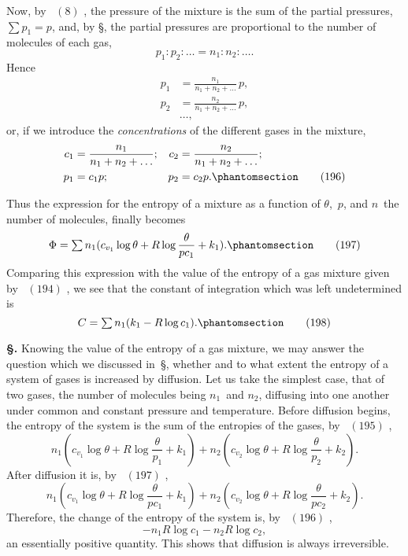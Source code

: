 \documentclass[12pt]{book}[2005/09/16]
\newcommand{\Typo}[2]{#2}
\newcommand{\Chg}[2]{#2}
\newcommand{\Add}[1]{\Chg{}{#1}}
\newcommand{\Erratum}[2]{#2}
\newcommand{\Section}[1]{
  \medskip\par\textbf{§\;#1}
  \label{section:#1}
}
\newcommand{\SecRef}[2][§\;]{\hyperref[section:#2.]{{\upshape #1#2}}}
\newcommand{\Tag}[1]{%
  \phantomsection\label{eqn:#1}\tag*{\ensuremath{#1}}%
}
\newcommand{\Eq}[1]{%
  \hyperref[eqn:#1]{\ensuremath{#1}}%
}
\newcommand{\PageSep}[1]{\ignorespaces}
\newcommand{\tsum}{\mathop{\textstyle\sum}\limits}
\begin{document}
Now, by~\Eq{(8)}, the pressure of the mixture is the sum of
the partial pressures, $\tsum p_{1} = p$, and, by \SecRef{40}, the partial
pressures are proportional to the number of molecules of
each gas,
\[
p_{1} : p_{2} : \dots = n_{1} : n_{2} : \dots\Add{.}
\]
Hence
\begin{align*}
p_{1} &= \frac{n_{1}}{n_{1} + n_{2} + \dots}\, p\Add{,} \\
p_{2} &= \frac{n_{2}}{n_{1} + n_{2} + \dots}\, p\Add{,} \\
& \dots\Add{,}
\end{align*}
or, if we introduce the \emph{concentrations} of the different gases
in the mixture,
\begin{align*}
c_{1} &= \frac{n_{1}}{n_{1} + n_{2} + \dots}; &
c_{2} &= \frac{n_{2}}{n_{1} + n_{2} + \dots}; \\
p_{1} &= c_{1} p; & p_{2} &= c_{2} p.
\Tag{(196)}
\end{align*}

Thus the expression for the entropy of a mixture as a
function of $\theta$,~$p$, and $n$~the number of molecules, finally
becomes
\[
\Phi = \tsum n_{1} (c_{v_{1}} \log \theta + R \log \frac{\theta}{pc_{1}} + k_{1}).
\Tag{(197)}
\]
Comparing this expression with the value of the entropy of
\PageSep{214}
a gas mixture given by~\Eq{(194)}, we see that the constant of
%
integration which was left undetermined is
\[
C = \tsum n_{1} (k_{1} - R \log c_{1})\Add{.}
\Tag{(198)}
\]

\Section{238.} Knowing the value of the entropy of a gas
%
%
%
%
mixture, we may answer the question which we discussed
in~\SecRef{234}, whether and to what extent the entropy of a
system of gases is increased by diffusion. Let us take the
simplest case, that of two gases, the number of molecules
being $n_{1}$~and $n_{2}$, diffusing into one another under common
and constant pressure and temperature. Before diffusion
begins, the entropy of the system is the sum of the entropies
of the gases, by~\Eq{(195)},
\[
n_{1} (c_{v_{1}} \log \theta + R \log \frac{\theta}{\Typo{p}{p_{1}}} + k_{1})
  + n_{2} (c_{v_{2}} \log \theta + R \log \frac{\theta}{\Typo{p}{p_{2}}} + k_{2}).
\]
After diffusion it is, by~\Eq{(197)},
\[
n_{1} (\Erratum{c_{v_{2}}}{c_{v_{1}}} \log \theta + R \log \frac{\theta}{pc_{1}} + k_{1})
  + n_{2} (c_{v_{2}} \log \theta + R \log \frac{\theta}{pc_{2}} + k_{2}).
\]
Therefore, the change of the entropy of the system is,
by~\Eq{(196)},
\[
-n_{1} R \log c_{1} - n_{2} R \log c_{2}\Add{,}
\]
an essentially positive quantity. This shows that diffusion
is always irreversible.
\end{document}
